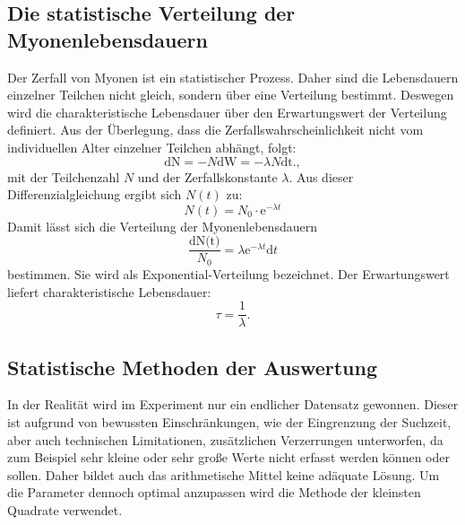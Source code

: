 \subsection{Die statistische Verteilung der Myonenlebensdauern}
Der Zerfall von Myonen ist ein statistischer Prozess. Daher sind die Lebensdauern einzelner Teilchen nicht gleich, sondern über eine Verteilung bestimmt. Deswegen wird die charakteristische Lebensdauer über den Erwartungswert der Verteilung definiert. Aus der Überlegung, dass die Zerfallswahrscheinlichkeit nicht vom individuellen Alter einzelner Teilchen abhängt, folgt:
\begin{equation}
    \text{dN} = -N \text{dW} = - \lambda N \text{dt} \text{.} \label{eq:stat},
\end{equation}
mit der Teilchenzahl $N$ und der Zerfallskonstante $\lambda$. Aus dieser Differenzialgleichung ergibt sich $N(t)$ zu:
\begin{equation}
    N(t) = N_0  \cdot \text{e}^{-\lambda t}
\end{equation}
Damit lässt sich die Verteilung der Myonenlebensdauern
\begin{equation}
    \frac{\text{dN(t)}}{N_0} = \lambda \text{e}^{-\lambda t} \text{d}t  \label{eq:stat2}
\end{equation}
bestimmen.
Sie wird als Exponential-Verteilung bezeichnet. Der Erwartungswert liefert charakteristische Lebensdauer:
\begin{equation}
    \tau = \frac{1}{\lambda}\text{.} \label{eq:stat3}
\end{equation}

\subsection{Statistische Methoden der Auswertung}
In der Realität wird im Experiment nur ein endlicher Datensatz gewonnen. Dieser ist aufgrund von bewussten Einschränkungen, wie der Eingrenzung der Suchzeit, aber auch technischen Limitationen, zusätzlichen Verzerrungen unterworfen, da zum Beispiel sehr kleine oder sehr große Werte nicht erfasst werden können oder sollen. Daher bildet auch das arithmetische Mittel keine adäquate Lösung. Um die Parameter dennoch optimal anzupassen wird die Methode der kleinsten Quadrate verwendet.